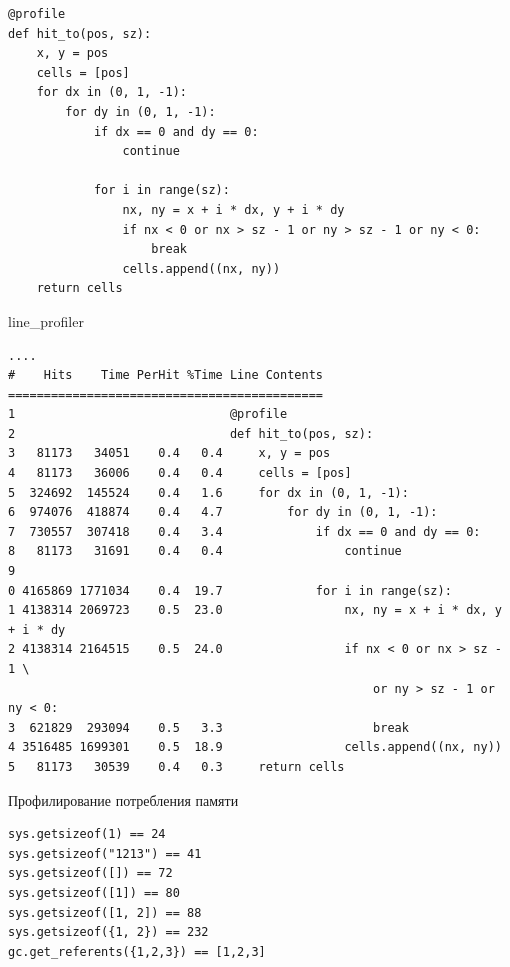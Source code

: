\documentclass{article}
\begin{document}
\begin{lstlisting}
@profile
def hit_to(pos, sz):
    x, y = pos
    cells = [pos]
    for dx in (0, 1, -1):
        for dy in (0, 1, -1):
            if dx == 0 and dy == 0:
                continue

            for i in range(sz):
                nx, ny = x + i * dx, y + i * dy
                if nx < 0 or nx > sz - 1 or ny > sz - 1 or ny < 0:
                    break
                cells.append((nx, ny))
    return cells
\end{lstlisting}
\newpage
\begin{center} line\_profiler \end{center}
\large
\begin{verbatim}
....
#    Hits    Time PerHit %Time Line Contents
============================================
1                              @profile
2                              def hit_to(pos, sz):
3   81173   34051    0.4   0.4     x, y = pos
4   81173   36006    0.4   0.4     cells = [pos]
5  324692  145524    0.4   1.6     for dx in (0, 1, -1):
6  974076  418874    0.4   4.7         for dy in (0, 1, -1):
7  730557  307418    0.4   3.4             if dx == 0 and dy == 0:
8   81173   31691    0.4   0.4                 continue
9                              
0 4165869 1771034    0.4  19.7             for i in range(sz):
1 4138314 2069723    0.5  23.0                 nx, ny = x + i * dx, y + i * dy
2 4138314 2164515    0.5  24.0                 if nx < 0 or nx > sz - 1 \
                                                   or ny > sz - 1 or ny < 0:
3  621829  293094    0.5   3.3                     break
4 3516485 1699301    0.5  18.9                 cells.append((nx, ny))
5   81173   30539    0.4   0.3     return cells
\end{verbatim}
\LARGE
\newpage

\begin{center} Профилирование потребления памяти \end{center}
\begin{lstlisting}
sys.getsizeof(1) == 24
sys.getsizeof("1213") == 41
sys.getsizeof([]) == 72
sys.getsizeof([1]) == 80
sys.getsizeof([1, 2]) == 88
sys.getsizeof({1, 2}) == 232
gc.get_referents({1,2,3}) == [1,2,3]
\end{lstlisting}
\newpage
\end{document}
